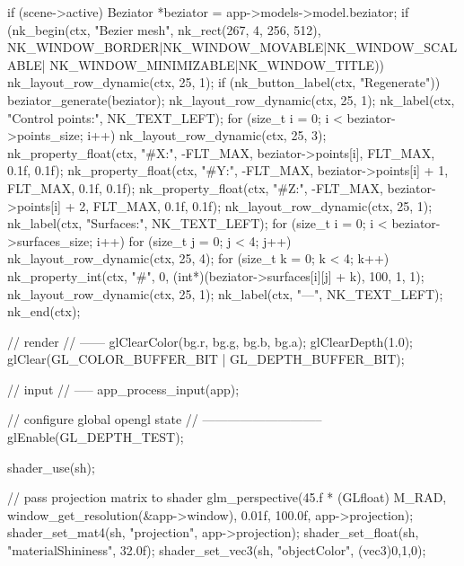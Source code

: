 \begin{multicols}{2}
\begin{ccode}
{{        if (scene->active) {
            Beziator *beziator = app->models->model.beziator;
            if (nk_begin(ctx, "Bezier mesh", nk_rect(267, 4, 256, 512),
                         NK_WINDOW_BORDER|NK_WINDOW_MOVABLE|NK_WINDOW_SCALABLE|
                         NK_WINDOW_MINIMIZABLE|NK_WINDOW_TITLE)) {
                nk_layout_row_dynamic(ctx, 25, 1);
                if (nk_button_label(ctx, "Regenerate"))
                    beziator_generate(beziator);
                nk_layout_row_dynamic(ctx, 25, 1);
                nk_label(ctx, "Control points:", NK_TEXT_LEFT);
                for (size_t i = 0; i < beziator->points_size; i++) {
                    nk_layout_row_dynamic(ctx, 25, 3);
                    nk_property_float(ctx, "#X:", -FLT_MAX, beziator->points[i],
                                      FLT_MAX, 0.1f, 0.1f);
                    nk_property_float(ctx, "#Y:", -FLT_MAX, beziator->points[i] + 1,
                                      FLT_MAX, 0.1f, 0.1f);
                    nk_property_float(ctx, "#Z:", -FLT_MAX, beziator->points[i] + 2,
                                      FLT_MAX, 0.1f, 0.1f);
                }
                nk_layout_row_dynamic(ctx, 25, 1);
                nk_label(ctx, "Surfaces:", NK_TEXT_LEFT);
                for (size_t i = 0; i < beziator->surfaces_size; i++) {
                    for (size_t j = 0; j < 4; j++) {
                        nk_layout_row_dynamic(ctx, 25, 4);
                        for (size_t k = 0; k < 4; k++) {
                            nk_property_int(ctx, "#", 0, (int*)(beziator->surfaces[i][j] + k),
                                              100, 1, 1);
                        }
                    }
                    nk_layout_row_dynamic(ctx, 25, 1);
                    nk_label(ctx, "---", NK_TEXT_LEFT);
                }
            }
            nk_end(ctx);
        }

        // render
        // ------
        glClearColor(bg.r, bg.g, bg.b, bg.a);
        glClearDepth(1.0);
        glClear(GL_COLOR_BUFFER_BIT | GL_DEPTH_BUFFER_BIT);

        // input
        // -----
        app_process_input(app);

        // configure global opengl state
        // -----------------------------
        glEnable(GL_DEPTH_TEST);

        shader_use(sh);

        // pass projection matrix to shader
        glm_perspective(45.f * (GLfloat) M_RAD,
                        window_get_resolution(&app->window),
                        0.01f, 100.0f, app->projection);
        shader_set_mat4(sh, "projection", app->projection);
        shader_set_float(sh, "materialShininess", 32.0f);
        shader_set_vec3(sh, "objectColor", (vec3){0,1,0});

}}
\end{ccode}
\end{multicols}
